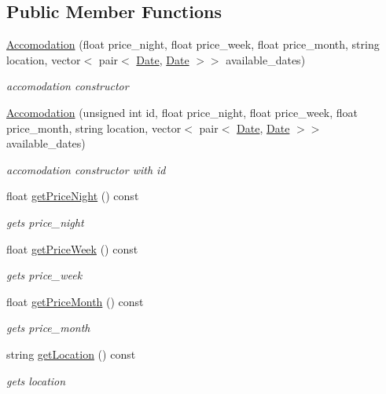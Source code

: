 \subsection*{Public Member Functions}
\begin{DoxyCompactItemize}
\item 
\hyperlink{class_accomodation_a6f9d474e6bf2cd77d0046c3584a50bc6}{Accomodation} (float price\+\_\+night, float price\+\_\+week, float price\+\_\+month, string location, vector$<$ pair$<$ \hyperlink{class_date}{Date}, \hyperlink{class_date}{Date} $>$$>$ available\+\_\+dates)
\begin{DoxyCompactList}\small\item\em accomodation constructor \end{DoxyCompactList}\item 
\hyperlink{class_accomodation_a1e9a337679884eeb358e998a26c7e98b}{Accomodation} (unsigned int id, float price\+\_\+night, float price\+\_\+week, float price\+\_\+month, string location, vector$<$ pair$<$ \hyperlink{class_date}{Date}, \hyperlink{class_date}{Date} $>$$>$ available\+\_\+dates)
\begin{DoxyCompactList}\small\item\em accomodation constructor with id \end{DoxyCompactList}\item 
float \hyperlink{class_accomodation_a9061a7cadf76377cbab25043e53ef5ef}{get\+Price\+Night} () const
\begin{DoxyCompactList}\small\item\em gets price\+\_\+night \end{DoxyCompactList}\item 
float \hyperlink{class_accomodation_ab466bd7dc51b8f48ac4e9152c96c95f7}{get\+Price\+Week} () const
\begin{DoxyCompactList}\small\item\em gets price\+\_\+week \end{DoxyCompactList}\item 
float \hyperlink{class_accomodation_a3e58fd8b7a752fb7c8709fcb979cfbb5}{get\+Price\+Month} () const
\begin{DoxyCompactList}\small\item\em gets price\+\_\+month \end{DoxyCompactList}\item 
string \hyperlink{class_accomodation_a4412dad54b791d4db1ebd01176c1333e}{get\+Location} () const
\begin{DoxyCompactList}\small\item\em gets location \end{DoxyCompactList}\item 

\end{DoxyCompactItemize}
